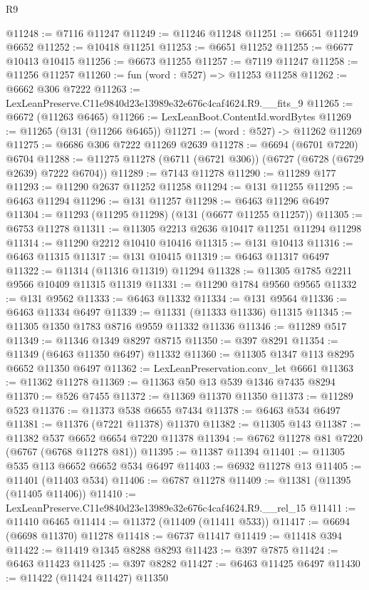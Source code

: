 \begin{lexlean}{R9}
\begin{coremodule}
@11248 := @7116 @11247
@11249 := @11246 @11248
@11251 := @6651 @11249 @6652
@11252 := @10418 @11251
@11253 := @6651 @11252
@11255 := @6677 @10413 @10415
@11256 := @6673 @11255
@11257 := @7119 @11247
@11258 := @11256 @11257
@11260 := fun (word : @527) => @11253 @11258
@11262 := @6662 @306 @7222
@11263 := LexLeanPreserve.C11e9840d23e13989e32e676c4caf4624.R9.__fits_9
@11265 := @6672 (@11263 @6465)
@11266 := LexLeanBoot.ContentId.wordBytes
@11269 := @11265 (@131 (@11266 @6465))
@11271 := (word : @527) -> @11262 @11269
@11275 := @6686 @306 @7222 @11269 @2639
@11278 := @6694 (@6701 @7220) @6704
@11288 := @11275 @11278 (@6711 (@6721 @306)) (@6727 (@6728 (@6729 @2639) @7222 @6704))
@11289 := @7143 @11278
@11290 := @11289 @177
@11293 := @11290 @2637 @11252 @11258
@11294 := @131 @11255
@11295 := @6463 @11294
@11296 := @131 @11257
@11298 := @6463 @11296 @6497
@11304 := @11293 (@11295 @11298) (@131 (@6677 @11255 @11257))
@11305 := @6753 @11278
@11311 := @11305 @2213 @2636 @10417 @11251 @11294 @11298
@11314 := @11290 @2212 @10410 @10416
@11315 := @131 @10413
@11316 := @6463 @11315
@11317 := @131 @10415
@11319 := @6463 @11317 @6497
@11322 := @11314 (@11316 @11319) @11294
@11328 := @11305 @1785 @2211 @9566 @10409 @11315 @11319
@11331 := @11290 @1784 @9560 @9565
@11332 := @131 @9562
@11333 := @6463 @11332
@11334 := @131 @9564
@11336 := @6463 @11334 @6497
@11339 := @11331 (@11333 @11336) @11315
@11345 := @11305 @1350 @1783 @8716 @9559 @11332 @11336
@11346 := @11289 @517
@11349 := @11346 @1349 @8297 @8715
@11350 := @397 @8291
@11354 := @11349 (@6463 @11350 @6497) @11332
@11360 := @11305 @1347 @113 @8295 @6652 @11350 @6497
@11362 := LexLeanPreservation.conv_let @6661
@11363 := @11362 @11278
@11369 := @11363 @50 @13 @539 @1346 @7435 @8294
@11370 := @526 @7455
@11372 := @11369 @11370 @11350
@11373 := @11289 @523
@11376 := @11373 @538 @6655 @7434
@11378 := @6463 @534 @6497
@11381 := @11376 (@7221 @11378) @11370
@11382 := @11305 @143
@11387 := @11382 @537 @6652 @6654 @7220 @11378
@11394 := @6762 @11278 @81 @7220 (@6767 (@6768 @11278 @81))
@11395 := @11387 @11394
@11401 := @11305 @535 @113 @6652 @6652 @534 @6497
@11403 := @6932 @11278 @13
@11405 := @11401 (@11403 @534)
@11406 := @6787 @11278
@11409 := @11381 (@11395 (@11405 @11406))
@11410 := LexLeanPreserve.C11e9840d23e13989e32e676c4caf4624.R9.__rel_15
@11411 := @11410 @6465
@11414 := @11372 (@11409 (@11411 @533))
@11417 := @6694 (@6698 @11370) @11278
@11418 := @6737 @11417
@11419 := @11418 @394
@11422 := @11419 @1345 @8288 @8293
@11423 := @397 @7875
@11424 := @6463 @11423
@11425 := @397 @8282
@11427 := @6463 @11425 @6497
@11430 := @11422 (@11424 @11427) @11350

\end{coremodule}
\end{lexlean}
